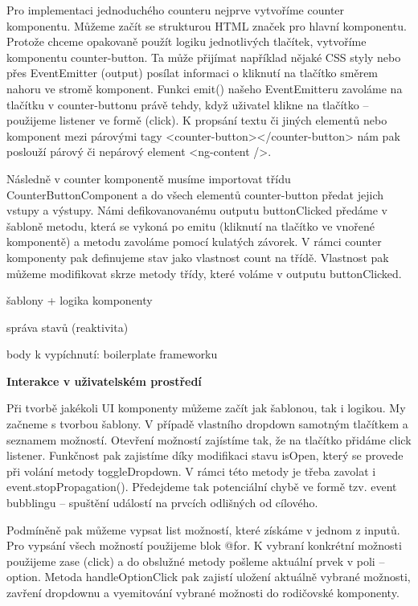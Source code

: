 Pro implementaci jednoduchého counteru nejprve vytvoříme counter komponentu. Můžeme začít se strukturou HTML značek pro hlavní komponentu. 
Protože chceme opakovaně použít logiku jednotlivých tlačítek, vytvoříme komponentu counter-button. 
Ta může přijímat například nějaké CSS styly nebo přes EventEmitter (output) posílat informaci o kliknutí na tlačítko směrem nahoru ve stromě komponent. 
Funkci emit() našeho EventEmitteru zavoláme na tlačítku v counter-buttonu právě tehdy, když uživatel klikne na tlačítko -- použijeme listener ve formě (click). 
K propsání textu či jiných elementů nebo komponent mezi párovými tagy <counter-button></counter-button> nám pak poslouží párový či nepárový element <ng-content />.

Následně v counter komponentě musíme importovat třídu CounterButtonComponent a do všech elementů counter-button předat jejich vstupy a výstupy. 
Námi defikovanovanému outputu buttonClicked předáme v šabloně metodu, která se vykoná po emitu (kliknutí na tlačítko ve vnořené komponentě) a metodu zavoláme pomocí kulatých závorek. 
V rámci counter komponenty pak definujeme stav jako vlastnost count na třídě. Vlastnost pak můžeme modifikovat skrze metody třídy, které voláme v outputu buttonClicked.

\begin{citemize}
	\item šablony + logika komponenty
	\item správa stavů (reaktivita)
	\item body k vypíchnutí: boilerplate frameworku
\end{citemize}

\begin{flushleft}
  \textbf{Interakce v uživatelském prostředí}
\end{flushleft}

Při tvorbě jakékoli UI komponenty můžeme začít jak šablonou, tak i logikou. My začneme s tvorbou šablony. V případě vlastního dropdown samotným tlačítkem a seznamem možností. 
Otevření možností zajístíme tak, že na tlačítko přidáme click listener. Funkčnost pak zajistíme díky modifikaci stavu isOpen, který se provede při volání metody toggleDropdown. 
V rámci této metody je třeba zavolat i event.stopPropagation(). Předejdeme tak potenciální chybě ve formě tzv. event bubblingu -- spuštění událostí na prvcích odlišných od cílového. 

Podmíněně pak můžeme vypsat list možností, které získáme v jednom z inputů. Pro vypsání všech možností použijeme blok @for. 
K vybraní konkrétní možnosti použijeme zase (click) a do obslužné metody pošleme aktuální prvek v poli -- option. 
Metoda handleOptionClick pak zajistí uložení aktuálně vybrané možnosti, zavření dropdownu a vyemitování vybrané možnosti do rodičovské komponenty.

